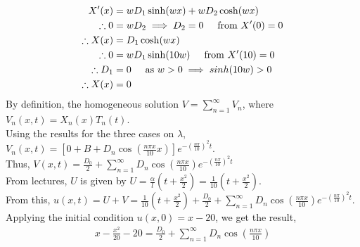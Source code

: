 \documentclass[a4paper]{article}
\newcommand{\ds}{\displaystyle}
\begin{document}
\begin{enumerate}
\begin{enumerate}
\begin{align*}
			X^{\prime}(x) & = wD_1\sinh(wx) + wD_2\cosh(wx)\\
			\therefore 0 & = wD_2 \implies D_2 = 0 \hspace{5mm} \text{from } X^{\prime}(0) = 0\\
			\therefore X(x) & = D_1\cosh(wx)\\
			\therefore 0 & = wD_1\sinh(10w) \hspace{5mm} \text{from } X^{\prime}(10) = 0\\
			\therefore D_1 & = 0 \hspace{5mm} \text{as } w>0 \implies sinh(10w)>0\\
			\therefore X(x) & = 0\\
		\end{align*}
		By definition, the homogeneous solution $\ds{V = \sum^{\infty}_{n=1} V_n}$, where $\ds{V_n(x,t) = X_n(x)T_n(t)}$.\\
		Using the results for the three cases on $\ds{\lambda}$, $\ds{V_n(x,t) = \left[0 + B +  D_n\cos\left(\frac{n\pi x}{10}x\right)\right]e^{-\left(\frac{n\pi}{10}\right)^2 t}}$.\\ 
		Thus, $\ds{V(x,t) = \frac{D_0}{2} + \sum^{\infty}_{n=1}D_n\cos\left(\frac{n\pi x}{10}\right)e^{-\left(\frac{n\pi}{10}\right)^2 t}}$\\
		From lectures, $\ds{U}$ is given by $\ds{U = \frac{\alpha}{l}\left(t+\frac{x^2}{2}\right) = \frac{1}{10}\left(t+\frac{x^2}{2}\right)}$.\\ 
		From this, $\ds{u(x,t) = U+V = \frac{1}{10}\left(t+\frac{x^2}{2}\right) + \frac{D_0}{2} +  \sum^{\infty}_{n=1}D_n\cos\left(\frac{n\pi x}{10}\right)e^{-\left(\frac{n\pi}{10}\right)^2 t}}$.\\
		Applying the initial condition $\ds{u(x,0) = x-20}$, we get the result,
		\begin{align*}
			x - \frac{x^2}{20} - 20 = \frac{D_0}{2} + \sum^{\infty}_{n=1}D_n\cos\left(\frac{n\pi x}{10}\right)\\
		\end{align*}

		\pagebreak


\end{enumerate}
\end{enumerate}
\end{document}
